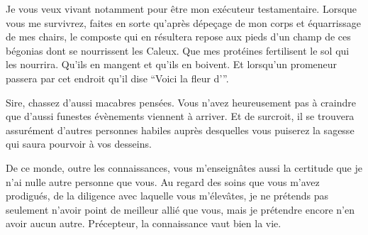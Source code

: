 \begin{drama}
               Je vous veux vivant notamment pour être mon exécuteur testamentaire. Lorsque vous me survivrez, faites en sorte qu’après dépeçage de mon corps et équarrissage de mes chairs, le composte qui en résultera repose aux pieds d’un champ de ces bégonias dont se nourrissent les Caleux. Que mes protéines fertilisent le sol qui les nourrira. Qu’ils en mangent et qu’ils en boivent. Et lorsqu’un promeneur passera par cet endroit qu’il dise \enquote{Voici la fleur d’\elena}.

  \alexasspeaks Sire, chassez d’aussi macabres pensées. Vous n’avez heureusement pas à craindre que d’aussi funestes évènements viennent à arriver. Et de surcroit, il se trouvera assurément d’autres personnes habiles auprès desquelles vous puiserez la sagesse qui saura pourvoir à vos desseins.

  \elenaspeaks De ce monde, outre les connaissances, vous m’enseignâtes aussi la certitude que je n’ai nulle autre personne que vous. Au regard des soins que vous m’avez prodigués, de la diligence avec laquelle vous m’élevâtes, je ne prétends pas seulement n’avoir point de meilleur allié que vous, mais je prétendre encore n’en avoir aucun autre. Précepteur, la connaissance vaut bien la vie.
\end{drama}

\act

\scene


\StageDirII{\choir, \elena, \ela, \maquerelle}



